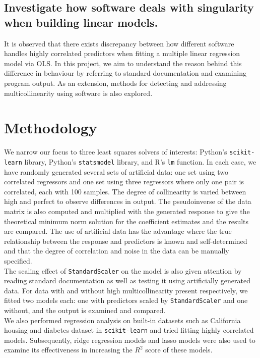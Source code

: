 \documentclass[12pt]{article}
\begin{document}
	
	\subsection{Investigate how software deals with singularity when building linear models.}
	
	It is observed that there exists discrepancy between how different software handles highly correlated predictors when fitting a multiple linear regression model via OLS. In this project, we aim to understand the reason behind this difference in behaviour by referring to standard documentation and examining program output. As an extension, methods for detecting and addressing multicollinearity using software is also explored.
	
	\pagebreak
	
	\section{Methodology}
	
	We narrow our focus to three least squares solvers of interests: Python's \texttt{scikit-learn} library, Python's \texttt{statsmodel} library, and R's \texttt{lm} function. In each case, we have randomly generated several sets of artificial data: one set using two correlated regressors and one set using three regressors where only one pair is correlated, each with 100 samples. The degree of collinearity is varied between high and perfect to observe differences in output. The pseudoinverse of the data matrix is also computed and multiplied with the generated response to give the theoretical minimum norm solution for the coefficient estimates and the results are compared. The use of artificial data has the advantage where the true relationship between the response and predictors is known and self-determined and that the degree of correlation and noise in the data can be manually specified.\\
	
	The scaling effect of \texttt{StandardScaler} on the model is also given attention by reading standard documentation as well as testing it using artificially generated data. For data with and without high multicollinearity present respectively, we fitted two models each: one with predictors scaled by \texttt{StandardScaler} and one without, and the output is examined and compared. \\
	
	We also performed regression analysis on built-in datasets such as California housing and diabetes dataset in \texttt{scikit-learn} and tried fitting highly correlated models. Subsequently, ridge regression models and lasso models were also used to examine its effectiveness in increasing the $R^2$ score of these models.
	
\end{document}

